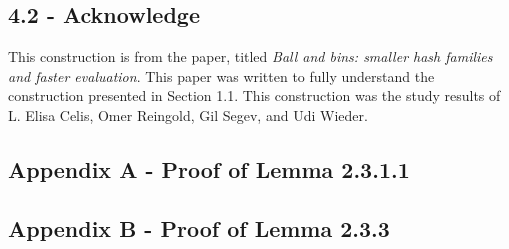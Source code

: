 \documentclass[a4paper, english]{paper}
\begin{document}
	 \subsection{4.2 - Acknowledge} 
	 This construction is from the paper, titled \textit{Ball and bins: smaller hash families and faster evaluation}. This paper was written to fully understand the construction presented in Section 1.1. This construction was the study results of L. Elisa Celis, Omer Reingold, Gil Segev, and Udi Wieder. 	
	 
	\subsection{Appendix A - Proof of Lemma 2.3.1.1}

	\subsection{Appendix B - Proof of Lemma 2.3.3} 
	\newpage
\end{document}
